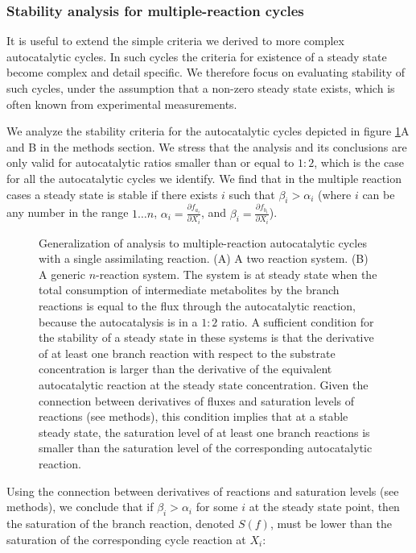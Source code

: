    \subsubsection{Stability analysis for multiple-reaction cycles}
    It is useful to extend the simple criteria we derived to more complex autocatalytic cycles.
    In such cycles the criteria for existence of a steady state become complex and detail specific.
    We therefore focus on evaluating stability of such cycles, under the assumption that a non-zero steady state exists, which is often known from experimental measurements.

    We analyze the stability criteria for the autocatalytic cycles depicted in figure \ref{fig:multiple}A and B in the methods section.
    We stress that the analysis and its conclusions are only valid for autocatalytic ratios smaller than or equal to $1\mathbin{:}2$, which is the case for all the autocatalytic cycles we identify.
    We find that in the multiple reaction cases a steady state is stable if there exists $i$ such that $\beta_i > \alpha_i$ (where $i$ can be any number in the range $1\dots n$, $\alpha_i=\frac{\partial f_{a_i}}{\partial X_i}$, and $\beta_i=\frac{\partial f_{b_i}}{\partial X_i}$).

\begin{figure}[!htb]
  \centering
      
     \caption{
     Generalization of analysis to multiple-reaction autocatalytic cycles with a single assimilating reaction.
     (A) A two reaction system.
     (B) A generic $n$-reaction system.
     The system is at steady state when the total consumption of intermediate metabolites by the branch reactions is equal to the flux through the autocatalytic reaction, because the autocatalysis is in a $1\mathbin{:}2$ ratio.
     A sufficient condition for the stability of a steady state in these systems is that the derivative of at least one branch reaction with respect to the substrate concentration is larger than the derivative of the equivalent autocatalytic reaction at the steady state concentration.
     Given the connection between derivatives of fluxes and saturation levels of reactions (see methods), this condition implies that at a stable steady state, the saturation level of at least one branch reactions is smaller than the saturation level of the corresponding autocatalytic reaction.
 }
     \label{fig:multiple}
\end{figure}

   Using the connection between derivatives of reactions and saturation levels (see methods), we conclude that if $\beta_i > \alpha_i$ for some $i$ at the steady state point, then the saturation of the branch reaction, denoted $S(f)$, must be lower than the saturation of the corresponding cycle reaction at $X_i$:

